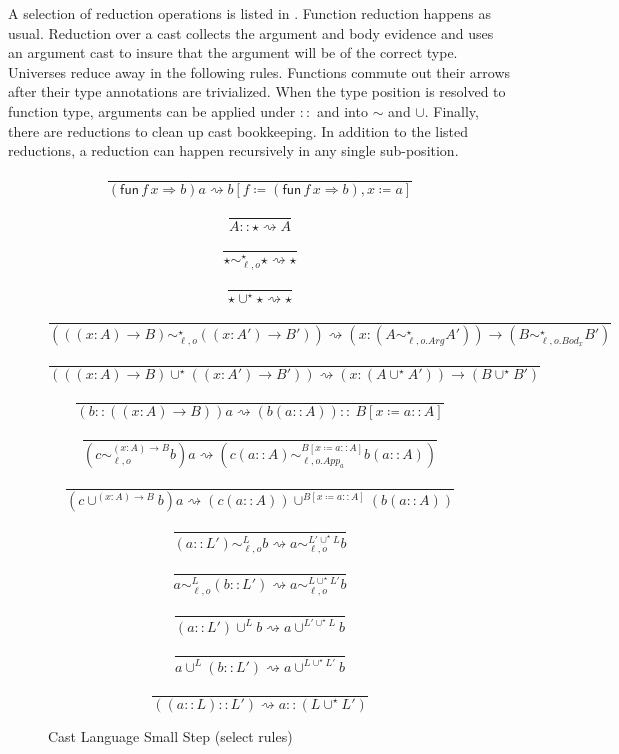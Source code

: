 A selection of reduction operations is listed in .
Function reduction happens as usual.
Reduction over a cast collects the argument and body evidence and uses an argument cast to insure that the argument will be of the correct type.
Universes reduce away in the following rules.
Functions commute out their arrows after their type annotations are trivialized.
When the type position is resolved to function type, arguments can be applied under $::$ and into $\sim$ and $\cup$.
Finally, there are reductions to clean up cast bookkeeping.
In addition to the listed reductions, a reduction can happen recursively in any single sub-position.

\begin{figure}
\[
\frac{\ }{\left(\mathsf{fun}\,f\,x\Rightarrow b\right)a\rightsquigarrow b\left[f\coloneqq\left(\mathsf{fun}\,f\,x\Rightarrow b\right),x\coloneqq a\right]}
\]

\[
\frac{\ }{A::\star\rightsquigarrow A}
\]

\[
\frac{\ }{\star\sim_{\ell,o}^{\star}\star\rightsquigarrow\star}
\]

\[
\frac{\ }{\star\cup^{\star}\star\rightsquigarrow\star}
\]

\[
\frac{\ }{\left(\left(\left(x:A\right)\rightarrow B\right)\sim_{\ell,o}^{\star}\left(\left(x:A'\right)\rightarrow B'\right)\right)\rightsquigarrow\left(x:\left(A\sim_{\ell,o.Arg}^{\star}A'\right)\right)\rightarrow\left(B\sim_{\ell,o.Bod_{x}}^{\star}B'\right)}
\]

\[
\frac{\ }{\left(\left(\left(x:A\right)\rightarrow B\right)\cup^{\star}\left(\left(x:A'\right)\rightarrow B'\right)\right)\rightsquigarrow\left(x:\left(A\cup^{\star}A'\right)\right)\rightarrow\left(B\cup^{\star}B'\right)}
\]

\[
\frac{\ }{\left(b::\left(\left(x:A\right)\rightarrow B\right)\right)a\rightsquigarrow\left(b\left(a::A\right)\right)::\ B\left[x\coloneqq a::A\right]}
\]

\[
\frac{\ }{\left(c\sim_{\ell,o}^{\left(x:A\right)\rightarrow B}b\right)a\rightsquigarrow\left(c\left(a::A\right)\sim_{\ell,o.App_{a}}^{B\left[x\coloneqq a::A\right]}b\left(a::A\right)\right)}
\]

\[
\frac{\ }{\left(c\cup^{\left(x:A\right)\rightarrow B}b\right)a\rightsquigarrow\left(c\left(a::A\right)\right)\cup^{B\left[x\coloneqq a::A\right]}\left(b\left(a::A\right)\right)}
\]

\[
\frac{\ }{\left(a::L'\right)\sim_{\ell,o}^{L}b\rightsquigarrow a\sim_{\ell,o}^{L'\cup^{\star}L}b}
\]

\[
\frac{\ }{a\sim_{\ell,o}^{L}\left(b::L'\right)\rightsquigarrow a\sim_{\ell,o}^{L\cup^{\star}L'}b}
\]

\[
\frac{\ }{\left(a::L'\right)\cup^{L}b\rightsquigarrow a\cup^{L'\cup^{\star}L}b}
\]

\[
\frac{\ }{a\cup^{L}\left(b::L'\right)\rightsquigarrow a\cup^{L\cup^{\star}L'}b}
\]

\[
\frac{\ }{\left(\left(a::L\right)::L'\right)\rightsquigarrow a::\left(L\cup^{\star}L'\right)}
\]
\caption{Cast Language Small Step (select rules)}
\label{fig:cast-step}
\end{figure}


